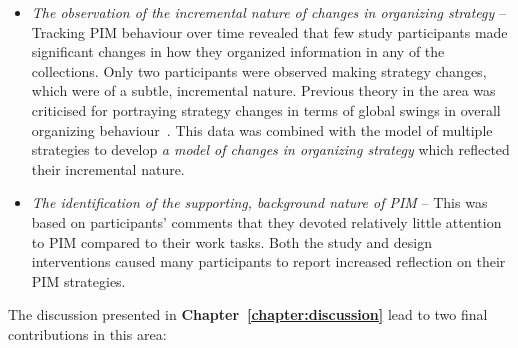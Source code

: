 \begin{itemize}

\item \textit{The observation of the incremental nature of changes in organizing strategy} -- Tracking PIM behaviour over time revealed that few study participants made significant changes in how they organized information in any of the collections.  Only two participants were observed making strategy changes, which were of a subtle, incremental nature.  Previous theory in the area was criticised for portraying strategy changes in terms of global swings in overall organizing behaviour~\citep{ob:97}.  This data was combined with the model of multiple strategies to develop \textit{a model of changes in organizing strategy} which reflected their incremental nature.  

\item \textit{The identification of the supporting, background nature of PIM} -- This was based on participants' comments that they devoted relatively little attention to PIM compared to their work tasks.  Both the study and design interventions caused many participants to report increased reflection on their PIM strategies.

\end{itemize}


The discussion presented in \textbf{Chapter~\ref{chapter:discussion}} lead to two final contributions in this area:


